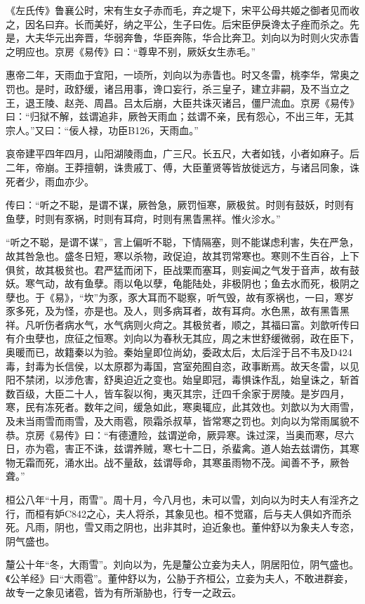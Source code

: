 \documentclass[]{article}
\begin{document}
《左氏传》鲁襄公时，宋有生女子赤而毛，弃之堤下，宋平公母共姬之御者见而收之，因名曰弃。长而美好，纳之平公，生子曰佐。后宋臣伊戾谗太子痤而杀之。先是，大夫华元出奔晋，华弱奔鲁，华臣奔陈，华合比奔卫。刘向以为时则火灾赤眚之明应也。京房《易传》曰：``尊卑不别，厥妖女生赤毛。''

惠帝二年，天雨血于宜阳，一顷所，刘向以为赤眚也。时又冬雷，桃李华，常奥之罚也。是时，政舒缓，诸吕用事，谗口妄行，杀三皇子，建立非嗣，及不当立之王，退王陵、赵尧、周昌。吕太后崩，大臣共诛灭诸吕，僵尸流血。京房《易传》曰：``归狱不解，兹谓追非，厥咎天雨血；兹谓不亲，民有怨心，不出三年，无其宗人。''又曰：``佞人禄，功臣B126，天雨血。''

哀帝建平四年四月，山阳湖陵雨血，广三尺。长五尺，大者如钱，小者如麻子。后二年，帝崩。王莽擅朝，诛贵戚丁、傅，大臣董贤等皆放徙远方，与诸吕同象，诛死者少，雨血亦少。

传曰：``听之不聪，是谓不谋，厥咎急，厥罚恒寒，厥极贫。时则有鼓妖，时则有鱼孽，时则有豕祸，时则有耳疴，时则有黑眚黑祥。惟火沴水。''

``听之不聪，是谓不谋''，言上偏听不聪，下情隔塞，则不能谋虑利害，失在严急，故其咎急也。盛冬日短，寒以杀物，政促迫，故其罚常寒也。寒则不生百谷，上下俱贫，故其极贫也。君严猛而闭下，臣战栗而塞耳，则妄闻之气发于音声，故有鼓妖。寒气动，故有鱼孽。雨以龟以孽，龟能陆处，非极阴也；鱼去水而死，极阴之孽也。于《易》，``坎''为豕，豕大耳而不聪察，听气毁，故有豕祸也，一曰，寒岁豕多死，及为怪，亦是也。及人，则多病耳者，故有耳疴。水色黑，故有黑眚黑祥。凡听伤者病水气，水气病则火疴之。其极贫者，顺之，其福曰富。刘歆听传曰有介虫孽也，庶征之恒寒。刘向以为春秋无其应，周之末世舒缓微弱，政在臣下，奥暖而已，故籍秦以为验。秦始皇即位尚幼，委政太后，太后淫于吕不韦及D424毒，封毒为长信侯，以太原郡为毒国，宫室苑囿自恣，政事断焉。故天冬雷，以见阳不禁闭，以涉危害，舒奥迫近之变也。始皇即冠，毒惧诛作乱，始皇诛之，斩首数百级，大臣二十人，皆车裂以徇，夷灭其宗，迁四千余家于房陵。是岁四月，寒，民有冻死者。数年之间，缓急如此，寒奥辄应，此其效也。刘歆以为大雨雪，及未当雨雪而雨雪，及大雨雹，陨霜杀叔草，皆常寒之罚也。刘向以为常雨属貌不恭。京房《易传》曰：``有德遭险，兹谓逆命，厥异寒。诛过深，当奥而寒，尽六日，亦为雹，害正不诛，兹谓养贼，寒七十二日，杀蜚禽。道人始去兹谓伤，其寒物无霜而死，涌水出。战不量敌，兹谓辱命，其寒虽雨物不茂。闻善不予，厥咎聋。''

桓公八年``十月，雨雪''。周十月，今八月也，未可以雪，刘向以为时夫人有淫齐之行，而桓有妒C842之心，夫人将杀，其象见也。桓不觉寤，后与夫人俱如齐而杀死。凡雨，阴也，雪又雨之阴也，出非其时，迫近象也。董仲舒以为象夫人专恣，阴气盛也。

釐公十年``冬，大雨雪''。刘向以为，先是釐公立妾为夫人，阴居阳位，阴气盛也。《公羊经》曰``大雨雹''。董仲舒以为，公胁于齐桓公，立妾为夫人，不敢进群妾，故专一之象见诸雹，皆为有所渐胁也，行专一之政云。
\end{document}
